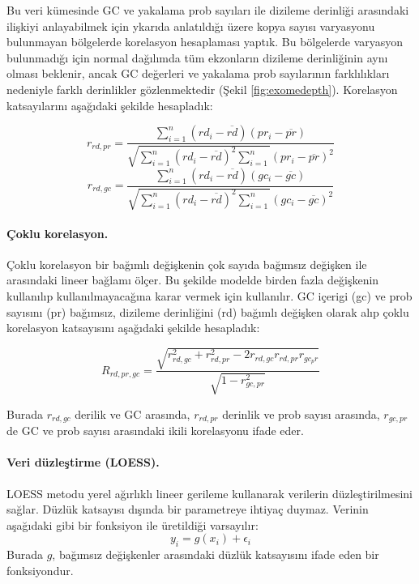 \documentclass[11pt]{article}
\begin{document}
Bu veri kümesinde GC ve yakalama prob sayıları ile dizileme derinliği arasındaki ilişkiyi anlayabilmek için ykarıda anlatıldığı üzere kopya sayısı varyasyonu bulunmayan bölgelerde korelasyon hesaplaması yaptık. Bu bölgelerde varyasyon bulunmadığı için normal dağılımda tüm ekzonların dizileme derinliğinin aynı olması beklenir, ancak GC değerleri ve yakalama prob sayılarının farklılıkları nedeniyle farklı derinlikler gözlenmektedir (Şekil \ref{fig:exomedepth}). Korelasyon katsayılarını aşağıdaki şekilde hesapladık:

\[r_{rd,pr} = \frac{\sum_{i=1}^{n}(rd_i-\overline{rd})(pr_i-\overline{pr})}{\sqrt{\sum_{i=1}^{n}(rd_i-\overline{rd})^2\sum_{i=1}^{n}}(pr_i-\overline{pr})^2} \]
\[r_{rd,gc} = \frac{\sum_{i=1}^{n}(rd_i-\overline{rd})(gc_i-\overline{gc})}{\sqrt{\sum_{i=1}^{n}(rd_i-\overline{rd})^2\sum_{i=1}^{n}}(gc_i-\overline{gc})^2} \]

\paragraph{Çoklu korelasyon.}
Çoklu korelasyon bir bağımlı değişkenin çok sayıda bağımsız değişken ile arasındaki lineer bağlamı ölçer. Bu şekilde modelde birden fazla değişkenin kullanılıp kullanılmayacağına karar vermek için kullanılır. GC içerigi (gc) ve prob sayısını (pr) bağımsız, dizileme derinliğini (rd) bağımlı değişken olarak alıp çoklu korelasyon katsayısını aşağıdaki şekilde hesapladık:

\[R_{rd,pr,gc} = \frac{\sqrt{r_{rd,gc}^2 + r_{rd,pr}^2 - 2r_{rd,gc}r_{rd,pr}r_{gc_pr}}}{\sqrt{1-r_{gc,pr}^2}}\]

Burada $r_{rd,gc}$ derilik ve GC arasında, $r_{rd,pr}$ derinlik ve prob sayısı arasında, $r_{gc,pr}$ de GC ve prob sayısı arasındaki ikili korelasyonu ifade eder.
\vspace*{-0.2cm}
\paragraph{Veri düzleştirme (LOESS).} 
LOESS metodu yerel ağırlıklı lineer gerileme kullanarak verilerin düzleştirilmesini sağlar. Düzlük katsayısı dışında bir parametreye ihtiyaç duymaz. Verinin aşağıdaki gibi bir fonksiyon ile üretildiği varsayılır:
\[y_i = g(x_i) + \epsilon_i\]
Burada $g$, bağımsız değişkenler arasındaki düzlük katsayısını ifade eden bir fonksiyondur.


\end{document}

